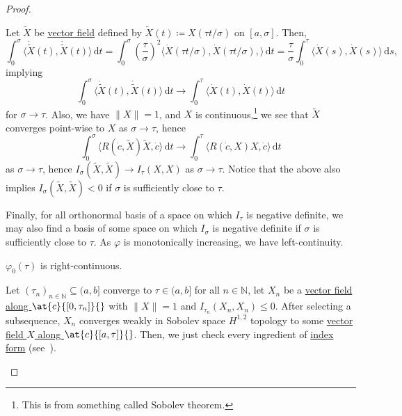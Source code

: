 \begin{proof}
\begin{explanation}
		Let \(\widetilde{X} \) be \hyperref[def:vector-field]{vector field} defined by \(\widetilde{X} (t) \coloneqq X (\tau t / \sigma)\) on \([a, \sigma ]\). Then,
		\[
			\int_{0}^{\sigma } \langle \dot{\widetilde{X} }(t), \dot{\widetilde{X} } (t) \rangle \,\mathrm{d}t
			= \int_{0}^{\sigma } \left( \frac{\tau }{\sigma } \right)^2 \langle \dot{X} (\tau t / \sigma), \dot{X} (\tau t / \sigma) , \rangle \,\mathrm{d}t
			= \frac{\tau}{\sigma } \int_{0}^{\tau } \langle \dot{X} (s), \dot{X} (s) \rangle  \,\mathrm{d}s,
		\]
		implying
		\[
			\int_{0}^{\sigma } \langle \dot{\widetilde{X} } (t), \dot{\widetilde{X} } (t) \rangle  \,\mathrm{d}t
			\to \int_{0}^{\tau } \langle \dot{X} (t), \dot{X} (t) \rangle \,\mathrm{d}t
		\]
		for \(\sigma \to \tau \). Also, we have \(\lVert X \rVert = 1\), and \(X\) is continuous,\footnote{This is from something called Sobolev theorem.} we see that \(\widetilde{X} \) converges point-wise to \(X\) as \(\sigma \to \tau \), hence
		\[
			\int_{0}^{\sigma } \langle R(\dot{c} , \widetilde{X} )\widetilde{X} , \dot{c}  \rangle  \,\mathrm{d}t
			\to \int_{0}^{\tau } \langle R(\dot{c} , X)X, \dot{c} \rangle \,\mathrm{d}t
		\]
		as \(\sigma \to \tau \), hence \(I_\sigma (\widetilde{X} , \widetilde{X} ) \to I_{\tau } (X, X)\) as \(\sigma \to \tau \). Notice that the above also implies \(I_\sigma (\widetilde{X} , \widetilde{X} ) < 0\) if \(\sigma \) is sufficiently close to \(\tau \).

		Finally, for all orthonormal basis of a space on which \(I_{\tau } \) is negative definite, we may also find a basis of some space on which \(I_\sigma \) is negative definite if \(\sigma \) is sufficiently close to \(\tau \). As \(\varphi \) is monotonically increasing, we have left-continuity.
	\end{explanation}

	\begin{claim}
		\(\varphi _0(\tau) \) is right-continuous.
	\end{claim}
	\begin{explanation}
		Let \((\tau _n)_{n\in \mathbb{N} } \subseteq (a, b]\) converge to \(\tau \in (a, b]\) for all \(n\in \mathbb{N} \), let \(X_n\) be a \hyperref[def:vector-field-along-curve]{vector field along \(\at{c}{[0, \tau _n]}{}\)} with \(\lVert X \rVert = 1\) and \(I_{\tau _n} (X_n, X_n) \leq 0\). After selecting a subsequence, \(X_n\) converges weakly in Sobolev space \(H^{1, 2}\) topology to some \hyperref[def:vector-field-along-curve]{vector field \(X\) along \(\at{c}{[a, \tau ]}{} \)}. Then, we just check every ingredient of \hyperref[def:index-form]{index form} (see~\cite{flaherty2013riemannian}).
	\end{explanation}


\end{proof}
